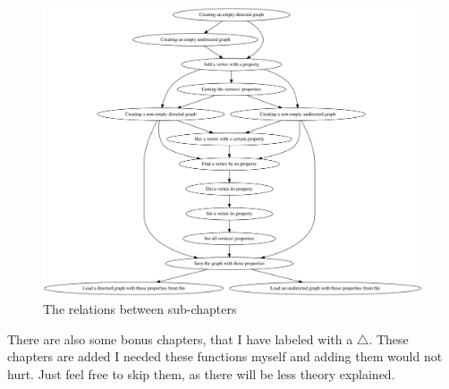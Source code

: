 \begin{figure}[!htbp]
  \includegraphics[width=\textwidth]{create_tutorial_subchapters_graph.png}
  \caption{
    The relations between sub-chapters
  }
  \label{fig:The-relations-between-subchapters}
\end{figure}

There are also some bonus chapters, that I have labeled with a $\triangle$.
These chapters are added I needed these functions myself and adding them
would not hurt.
Just feel free to skip them, as there will be less theory explained.

